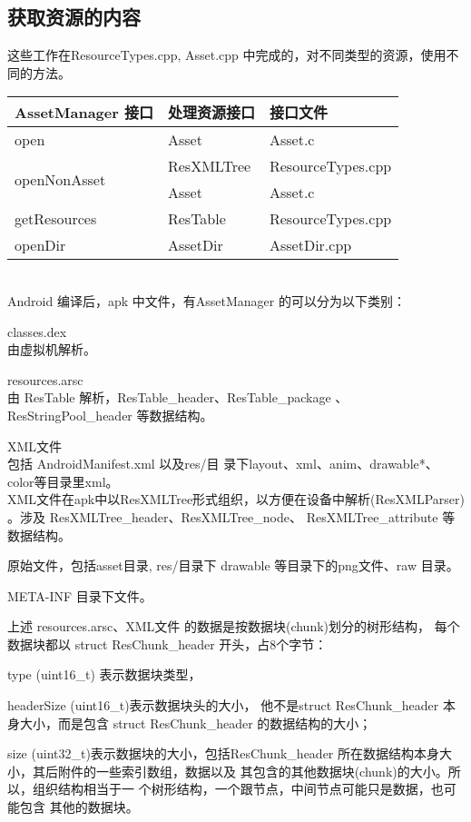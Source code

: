 \documentclass[a4paper,11pt]{article}
\begin{document}
\subsection{获取资源的内容}
这些工作在ResourceTypes.cpp, Asset.cpp 中完成的，对不同类型的资源，使用不同的方法。

\begin{tabular}{lll}
    AssetManager 接口& 处理资源接口 & 接口文件 \\\hline
    open & Asset & Asset.c \\\hline
   \multirow{2}{*}{openNonAsset}  & ResXMLTree & ResourceTypes.cpp \\
    &Asset &Asset.c\\\hline
    getResources & ResTable & ResourceTypes.cpp \\\hline
     openDir& AssetDir &AssetDir.cpp \\\hline
\end{tabular}
\\Android 编译后，apk 中文件，有AssetManager 的可以分为以下类别：
\begin{enumerate*}
    \item classes.dex \\由虚拟机解析。
    \item resources.arsc \\由 ResTable 解析，ResTable_header、ResTable_package
        、ResStringPool_header 等数据结构。
    \item XML文件\\包括 AndroidManifest.xml 以及res/目
        录下layout、xml、anim、drawable*、color等目录里xml。
        \\XML文件在apk中以ResXMLTree形式组织，以方便在设备中解析(ResXMLParser)
        。涉及 ResXMLTree_header、ResXMLTree_node、
        ResXMLTree_attribute 等数据结构。
    \item 原始文件，包括asset目录, res/目录下 drawable 等目录下的png文件、raw
        目录。 
    \item META-INF 目录下文件。
\end{enumerate*}
上述 resources.arsc、XML文件 的数据是按数据块(chunk)划分的树形结构，
每个数据块都以 struct ResChunk_header 开头，占8个字节：
\begin{description*}
    \item [type] (uint16_t) 表示数据块类型，
    \item [headerSize] (uint16_t)表示数据块头的大小，
        他不是struct ResChunk_header 本身大小，而是包含
        struct ResChunk_header 的数据结构的大小；
    \item [size] (uint32_t)表示数据块的大小，包括ResChunk_header
        所在数据结构本身大小，其后附件的一些索引数组，数据以及
        其包含的其他数据块(chunk)的大小。所以，组织结构相当于一
        个树形结构，一个跟节点，中间节点可能只是数据，也可能包含
        其他的数据块。
\end{description*}
\end{document}
